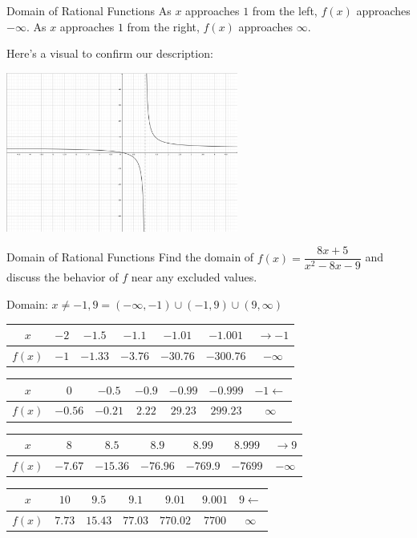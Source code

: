 \documentclass[t]{beamer}
\begin{document}
	\begin{frame}{Domain of Rational Functions}
		As $x$ approaches $1$ from the left, $f(x)$ approaches $-\infty$. As $x$ approaches $1$ from the right, $f(x)$ approaches $\infty$.
		
		Here's a visual to confirm our description: \pause
		
		\includegraphics[width=3in]{Rat1.png}
	\end{frame}

	\begin{frame}{Domain of Rational Functions}
		Find the domain of $f(x) = \dfrac{8x + 5}{x^2 - 8x - 9}$ and discuss the behavior of $f$ near any excluded values. \pause
		
		Domain: $x \neq -1, 9 = (-\infty, -1) \cup (-1, 9) \cup (9,\infty)$ \pause
		
		\begin{tabular}{c|cccccc}
			$x$ & $ -2 $ & $-1.5$ & $-1.1$ & $-1.01$ & $-1.001$ & $\to -1$ \\ \hline
			$f(x)$ & $-1$ & $-1.33$ & $-3.76$ & $-30.76$ & $-300.76$ & $-\infty$ 
		\end{tabular} \pause
	
		\begin{tabular}{c|cccccc}
			$x$ & $0$ & $-0.5$ & $-0.9$ & $-0.99$ & $-0.999$ & $-1 \leftarrow$ \\ \hline
			$f(x)$ & $-0.56$ & $-0.21$ & $2.22$ & $29.23$ & $299.23$ & $\infty$
		\end{tabular} \pause
	
	\begin{tabular}{c|cccccc}
		$x$ & $ 8 $ & $8.5$ & $8.9$ & $8.99$ & $8.999$ & $\to 9$ \\ \hline
		$f(x)$ & $-7.67$ & $-15.36$ & $-76.96$ & $-769.9$ & $-7699$ & $-\infty$
	\end{tabular} \pause

	\begin{tabular}{c|cccccc}
		$x$ & $ 10 $ & $9.5$ & $9.1$ & $9.01$ & $9.001$ & $9 \leftarrow$ \\ \hline
		$f(x)$ & $7.73$ & $15.43$ & $77.03$ & $770.02$ & $7700$ & $\infty$
	\end{tabular}
	\end{frame}
\end{document}
